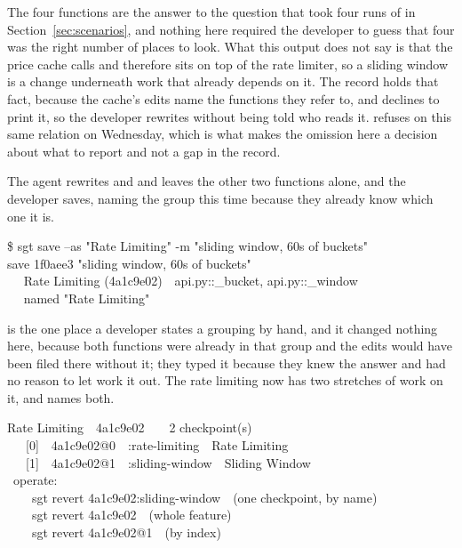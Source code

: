 \noindent
The four functions are the answer to the question that took four runs of
 in Section~\ref{sec:scenarios}, and nothing here required the
developer to guess that four was the right number of places to look. What this
output does not say is that the price cache calls  and
therefore sits on top of the rate limiter, so a sliding window is a change
underneath work that already depends on it. The record holds that fact, because the
cache's edits name the functions they refer to, and  declines to print it,
so the developer rewrites  without being told who reads it.
 refuses on this same relation on Wednesday, which is what makes the
omission here a decision about what to report and not a gap in the record.

The agent rewrites  and  and leaves the
other two functions alone, and the developer saves, naming the group this time
because they already know which one it is.

\begin{out}
\$ sgt save --as "Rate Limiting" -m "sliding window, 60s of buckets"\\
\ttok{} save 1f0aee3 "sliding window, 60s of buckets"\\
~~\ttlast{}\ttdisc{} Rate Limiting (4a1c9e02)~~api.py::\_bucket, api.py::\_window\\
~~\ttok{} named "Rate Limiting"
\end{out}

\noindent
{} is the one place a developer states a grouping by hand, and it changed
nothing here, because both functions were already in that group and the edits would
have been filed there without it; they typed it because they knew the answer and had
no reason to let \sgt{} work it out. The rate limiting now has two stretches of work
on it, and  names both.

\begin{out}
\ttdisc{} Rate Limiting~~4a1c9e02~~\ttdot{}~~2 checkpoint(s)\\[0.35ex]
~~~[0\ttfull\ttfull\ttfull]~~4a1c9e02@0~~:rate-limiting~~Rate Limiting\\
~~~[1\ttfull\ttfull\ttempty]~~4a1c9e02@1~~:sliding-window~~Sliding Window\\[0.35ex]
~operate:\\
~~~~sgt revert 4a1c9e02:sliding-window~~(one checkpoint, by name)\\
~~~~sgt revert 4a1c9e02~~(whole feature)\\
~~~~sgt revert 4a1c9e02@1~~(by index)
\end{out}

